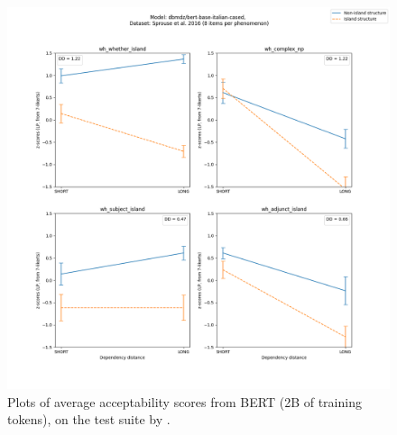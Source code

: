 \begin{figure}[p]
	\centering
	\includegraphics[width=1\textwidth]{images/Chapter1/Sprouse_wh_dbmdz_bert-base-italian-cased_LP-zscores-likert-2022-09-17_h11m04s37.png} 
	\caption{Plots of average acceptability scores from BERT (2B of training tokens), on the test suite by \citet{sprouse2016experimental}.}
	\label{fig:sprouse_bert2b_lp} 
	\medskip
\end{figure}	

\clearpage




